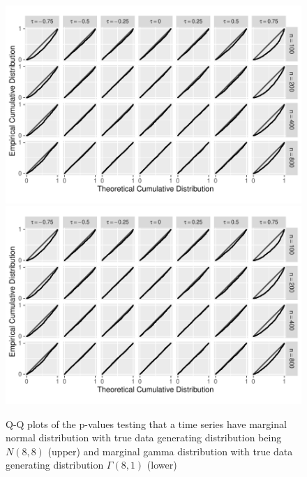 \documentclass[12pt, titlepage, letterpaper]{article}
\begin{document}
\begin{figure}[tbp]
  \centering
  \includegraphics[width = .9\textwidth]{figures/normal}
  \includegraphics[width = .9\textwidth]{figures/gamma}
  \caption{Q-Q plots of the p-values testing that a time series
    have marginal normal distribution with true data generating distribution
    being $N(8,8)$ (upper) and marginal gamma distribution with true data
    generating distribution $\Gamma(8,1)$ (lower)}
  \label{fig:qq}
\end{figure}
\end{document}
